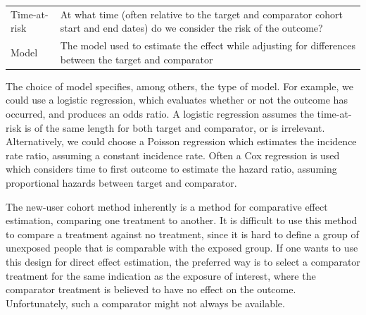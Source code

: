 \documentclass[11pt]{book}
\theoremstyle{definition}
\theoremstyle{definition}
\theoremstyle{definition}
\theoremstyle{remark}
\let\BeginKnitrBlock\begin \let\EndKnitrBlock\end
\begin{document}
\begin{longtable}[]{@{}ll@{}}
\begin{minipage}[t]{0.23\columnwidth}
Time-at-risk\strut
\end{minipage} & \begin{minipage}[t]{0.72\columnwidth}\raggedright
At what time (often relative to the target and comparator cohort start and end dates) do we consider the risk of the outcome?\strut
\end{minipage}\tabularnewline
\begin{minipage}[t]{0.23\columnwidth}\raggedright
Model\strut
\end{minipage} & \begin{minipage}[t]{0.72\columnwidth}\raggedright
The model used to estimate the effect while adjusting for differences between the target and comparator\strut
\end{minipage}\tabularnewline
\bottomrule
\end{longtable}

The choice of model specifies, among others, the type of model. For example, we could use a logistic regression, which evaluates whether or not the outcome has occurred, and produces an odds ratio. A logistic regression assumes the time-at-risk is of the same length for both target and comparator, or is irrelevant. Alternatively, we could choose a Poisson regression which estimates the incidence rate ratio, assuming a constant incidence rate. Often a Cox regression is used which considers time to first outcome to estimate the hazard ratio, assuming proportional hazards between target and comparator.

\BeginKnitrBlock{rmdimportant}
The new-user cohort method inherently is a method for comparative effect estimation, comparing one treatment to another. It is difficult to use this method to compare a treatment against no treatment, since it is hard to define a group of unexposed people that is comparable with the exposed group. If one wants to use this design for direct effect estimation, the preferred way is to select a comparator treatment for the same indication as the exposure of interest, where the comparator treatment is believed to have no effect on the outcome. Unfortunately, such a comparator might not always be available.
\EndKnitrBlock{rmdimportant}
\end{document}
